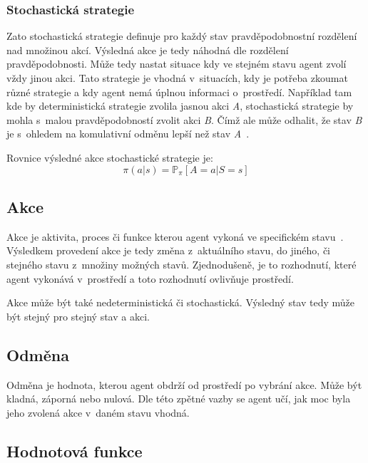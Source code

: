   \subsubsection*{Stochastická strategie}
  
  Zato stochastická strategie definuje pro každý stav pravděpodobnostní rozdělení nad množinou akcí.
  Výsledná akce je tedy náhodná dle rozdělení pravděpodobnosti.
  Může tedy nastat situace kdy ve stejném stavu agent zvolí vždy jinou akci.
  Tato strategie je vhodná v~situacích, kdy je potřeba zkoumat různé strategie a kdy agent nemá úplnou informaci o~prostředí.
  Například tam kde by deterministická strategie zvolila jasnou akci \textit{A}, stochastická strategie by mohla s~malou pravděpodobností zvolit akci \textit{B}.
  Čímž ale může odhalit, že stav \textit{B} je s~ohledem na komulativní odměnu lepší než stav \textit{A}~\cite{Policies}.

  Rovnice výsledné akce stochastické strategie je:
  \begin{equation}
    \pi(a \vert s) = \mathbb{P}_\pi [A=a \vert S=s]\label{eq:policy_stochastic}
  \end{equation}

\subsection{Akce}\label{subsec:akce}

Akce je aktivita, proces či funkce kterou agent vykoná ve specifickém stavu~\cite{ActionCo67}.
Výsledkem provedení akce je tedy změna z~aktuálního stavu, do jiného, či stejného stavu z~množiny možných stavů.
Zjednodušeně, je to rozhodnutí, které agent vykonává v~prostředí a toto rozhodnutí ovlivňuje prostředí.

Akce může být také nedeterministická či stochastická.
Výsledný stav tedy může být stejný pro stejný stav a akci.
  
\subsection{Odměna}\label{subsec:odmena}

  Odměna je hodnota, kterou agent obdrží od prostředí po vybrání akce.
  Může být kladná, záporná nebo nulová.
  Dle této zpětné vazby se agent učí, jak moc byla jeho zvolená akce v~daném stavu vhodná.

\subsection{Hodnotová funkce}\label{subsec:hodnotova-funkce}

